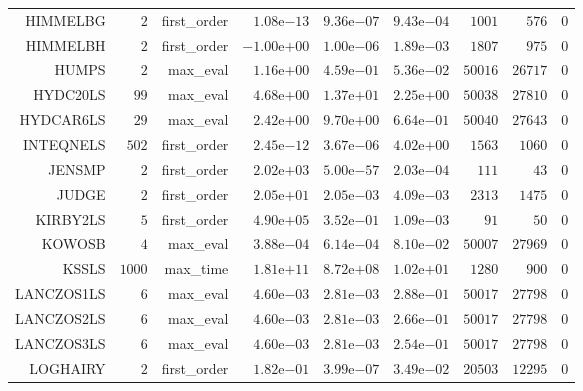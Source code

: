 \begin{longtable}{rrrrrrrrr}
HIMMELBG & \(     2\) & first\_order & \( 1.08\)e\(-13\) & \( 9.36\)e\(-07\) & \( 9.43\)e\(-04\) & \(  1001\) & \(   576\) & \(     0\) \\
HIMMELBH & \(     2\) & first\_order & \(-1.00\)e\(+00\) & \( 1.00\)e\(-06\) & \( 1.89\)e\(-03\) & \(  1807\) & \(   975\) & \(     0\) \\
HUMPS & \(     2\) & max\_eval & \( 1.16\)e\(+00\) & \( 4.59\)e\(-01\) & \( 5.36\)e\(-02\) & \( 50016\) & \( 26717\) & \(     0\) \\
HYDC20LS & \(    99\) & max\_eval & \( 4.68\)e\(+00\) & \( 1.37\)e\(+01\) & \( 2.25\)e\(+00\) & \( 50038\) & \( 27810\) & \(     0\) \\
HYDCAR6LS & \(    29\) & max\_eval & \( 2.42\)e\(+00\) & \( 9.70\)e\(+00\) & \( 6.64\)e\(-01\) & \( 50040\) & \( 27643\) & \(     0\) \\
INTEQNELS & \(   502\) & first\_order & \( 2.45\)e\(-12\) & \( 3.67\)e\(-06\) & \( 4.02\)e\(+00\) & \(  1563\) & \(  1060\) & \(     0\) \\
JENSMP & \(     2\) & first\_order & \( 2.02\)e\(+03\) & \( 5.00\)e\(-57\) & \( 2.03\)e\(-04\) & \(   111\) & \(    43\) & \(     0\) \\
JUDGE & \(     2\) & first\_order & \( 2.05\)e\(+01\) & \( 2.05\)e\(-03\) & \( 4.09\)e\(-03\) & \(  2313\) & \(  1475\) & \(     0\) \\
KIRBY2LS & \(     5\) & first\_order & \( 4.90\)e\(+05\) & \( 3.52\)e\(-01\) & \( 1.09\)e\(-03\) & \(    91\) & \(    50\) & \(     0\) \\
KOWOSB & \(     4\) & max\_eval & \( 3.88\)e\(-04\) & \( 6.14\)e\(-04\) & \( 8.10\)e\(-02\) & \( 50007\) & \( 27969\) & \(     0\) \\
KSSLS & \(  1000\) & max\_time & \( 1.81\)e\(+11\) & \( 8.72\)e\(+08\) & \( 1.02\)e\(+01\) & \(  1280\) & \(   900\) & \(     0\) \\
LANCZOS1LS & \(     6\) & max\_eval & \( 4.60\)e\(-03\) & \( 2.81\)e\(-03\) & \( 2.88\)e\(-01\) & \( 50017\) & \( 27798\) & \(     0\) \\
LANCZOS2LS & \(     6\) & max\_eval & \( 4.60\)e\(-03\) & \( 2.81\)e\(-03\) & \( 2.66\)e\(-01\) & \( 50017\) & \( 27798\) & \(     0\) \\
LANCZOS3LS & \(     6\) & max\_eval & \( 4.60\)e\(-03\) & \( 2.81\)e\(-03\) & \( 2.54\)e\(-01\) & \( 50017\) & \( 27798\) & \(     0\) \\
LOGHAIRY & \(     2\) & first\_order & \( 1.82\)e\(-01\) & \( 3.99\)e\(-07\) & \( 3.49\)e\(-02\) & \( 20503\) & \( 12295\) & \(     0\) \\

\end{longtable}

